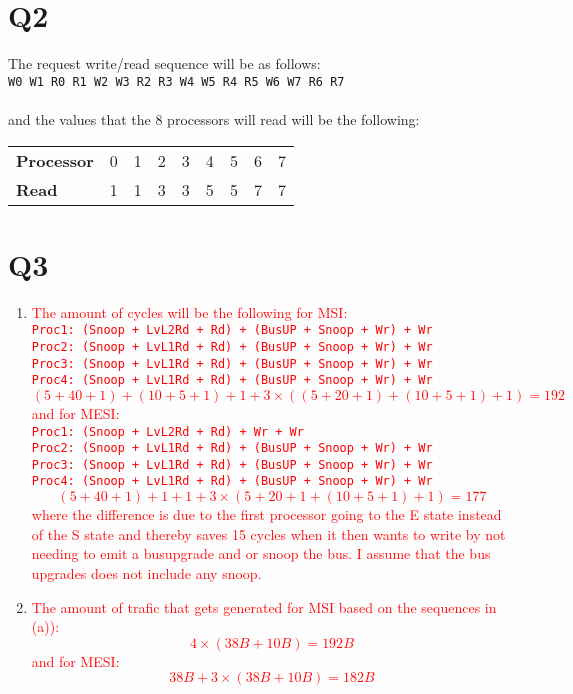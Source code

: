 \documentclass[a4paper]{article}
\begin{document}
\section*{Q2}
The request write/read sequence will be as follows: \\

\texttt{W0~W1~R0~R1~W2~W3~R2~R3~W4~W5~R4~R5~W6~W7~R6~R7} \\ \\
and the values that the 8 processors will read will be the following:\\

\begin{tabular}{ l | c c c c c c c c }

\textbf{Processor} & 0 & 1 & 2 & 3 & 4 & 5 & 6 & 7 \\
\textbf{Read}     & 1 & 1 & 3 & 3 & 5 & 5 & 7 & 7 \\

\end{tabular}

\section*{Q3}
\begin{enumerate}
\item %
\label{itm:3a}
\textcolor{red}{
The amount of cycles will be the following for MSI:
\texttt{
  \\Proc1: (Snoop + LvL2Rd + Rd) + (BusUP + Snoop + Wr) + Wr
  \\Proc2: (Snoop + LvL1Rd + Rd) + (BusUP + Snoop + Wr) + Wr
  \\Proc3: (Snoop + LvL1Rd + Rd) + (BusUP + Snoop + Wr) + Wr
  \\Proc4: (Snoop + LvL1Rd + Rd) + (BusUP + Snoop + Wr) + Wr 
}
}
\textcolor{red}{
\[(5+40+1)+(10+5+1)+1+3\times((5+20+1)+(10+5+1)+1) = 192\]
and for MESI:
\texttt{
  \\Proc1: (Snoop + LvL2Rd + Rd) + Wr + Wr
  \\Proc2: (Snoop + LvL1Rd + Rd) + (BusUP + Snoop + Wr) + Wr
  \\Proc3: (Snoop + LvL1Rd + Rd) + (BusUP + Snoop + Wr) + Wr
  \\Proc4: (Snoop + LvL1Rd + Rd) + (BusUP + Snoop + Wr) + Wr 
}
}
\textcolor{red}{
\[(5+40+1)+1+1+3\times(5+20+1+(10+5+1)+1) = 177\]
where the difference is due to the first processor going to the E state instead of the S state and thereby saves 15 cycles when it then wants to write by not needing to emit a busupgrade and or snoop the bus. I assume that the bus upgrades does not include any snoop.}

\item %
\textcolor{red}{
The amount of trafic that gets generated for MSI based on the sequences in (a)):
\[4\times(38B+10B) = 192B\]
and for MESI:
\[38B+3\times(38B+10B) = 182B\]
}
\end{enumerate}
\end{document}
